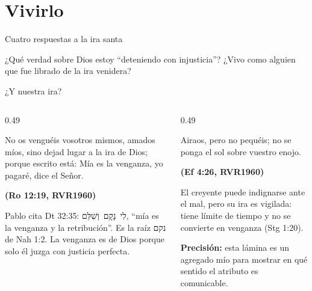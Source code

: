 \documentclass[hyperref={bookmarks=false},aspectratio=169]{beamer}
\newcommand{\heb}[1]{\mbox{\foreignlanguage{hebrew}{#1}}}
\newcommand{\fuente}[1]{\par\hfill{\upshape\bfseries\footnotesize\textcolor{azul}{#1}}}
\newcommand{\precision}[1]{{\footnotesize\color{gris}\textbf{Precisión:} #1}}
\begin{document}
\section{Vivirlo}

\begin{frame}{Cuatro respuestas a la ira santa}
\centering
{}\par\medskip
\small\RaggedRight ¿Qué verdad sobre Dios estoy ``deteniendo con injusticia''? ¿Vivo como alguien que fue librado de la ira venidera?
\end{frame}

\begin{frame}{¿Y nuestra ira?}
\begin{columns}[t,onlytextwidth]
\begin{column}{0.49\textwidth}
\begin{cita}No os venguéis vosotros mismos, amados míos, sino dejad lugar a la ira de Dios; porque escrito está: Mía es la venganza, yo pagaré, dice el Señor.\fuente{(Ro 12:19, RVR1960)}\end{cita}
\scriptsize Pablo cita Dt 32:35: \heb{לִי נָקָם וְשִׁלֵּם}, ``mía es la venganza y la retribución''. Es la raíz \heb{נקם} de Nah 1:2. La venganza es de Dios porque solo él juzga con justicia perfecta.
\end{column}
\begin{column}{0.49\textwidth}
\begin{cita}Airaos, pero no pequéis; no se ponga el sol sobre vuestro enojo.\fuente{(Ef 4:26, RVR1960)}\end{cita}
\small El creyente puede indignarse ante el mal, pero su ira es vigilada: tiene límite de tiempo y no se convierte en venganza (Stg 1:20).\par\smallskip
\precision{esta lámina es un agregado mío para mostrar en qué sentido el atributo es comunicable.}
\end{column}
\end{columns}
\end{frame}
\end{document}
